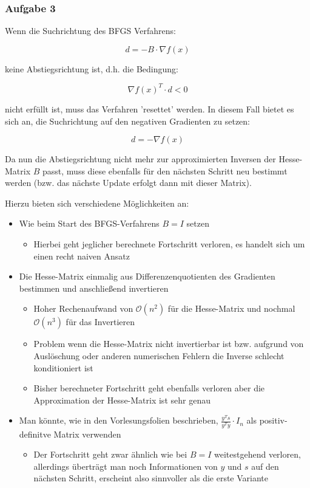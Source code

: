 \documentclass[a4paper, 12pt]{report}
\begin{document}
\subsubsection{Aufgabe 3}
Wenn die Suchrichtung des BFGS Verfahrens:

$$d = -B\cdot \nabla f(x) $$

keine Abstiegsrichtung ist, d.h. die Bedingung:

$$\nabla f(x)^T \cdot d < 0 $$

nicht erfüllt ist, muss das Verfahren 'resettet' werden. In diesem Fall bietet es sich an, die Suchrichtung auf den
negativen Gradienten zu setzen:

$$d = -\nabla f(x)$$

Da nun die Abstiegsrichtung nicht mehr zur approximierten Inversen der Hesse-Matrix $B$ passt, muss diese ebenfalls für
den nächsten Schritt neu bestimmt werden (bzw. das nächste Update erfolgt dann mit dieser Matrix).\par
Hierzu bieten sich verschiedene Möglichkeiten an:

\begin{itemize}
  \item Wie beim Start des BFGS-Verfahrens $B = I$ setzen
  \begin{itemize}
    \item Hierbei geht jeglicher berechnete Fortschritt verloren, es handelt sich um einen recht naiven Ansatz
  \end{itemize}
  \item Die Hesse-Matrix einmalig aus Differenzenquotienten des Gradienten bestimmen und anschließend invertieren
  \begin{itemize}
    \item Hoher Rechenaufwand von $\mathcal{O}(n^2)$ für die Hesse-Matrix und nochmal $\mathcal{O}(n^3)$ für das Invertieren
    \item Problem wenn die Hesse-Matrix nicht invertierbar ist bzw. aufgrund von Auslöschung oder anderen numerischen Fehlern
    die Inverse schlecht konditioniert ist
    \item Bisher berechneter Fortschritt geht ebenfalls verloren aber die Approximation der Hesse-Matrix ist sehr genau
  \end{itemize}
  \item Man könnte, wie in den Vorlesungsfolien beschrieben,  $\frac{y^Ts}{y^Ty}\cdot I_n$ als positiv-definitve Matrix verwenden
  \begin{itemize}
    \item Der Fortschritt geht zwar ähnlich wie bei $B = I$ weitestgehend verloren, allerdings überträgt man noch Informationen
    von $y$ und $s$ auf den nächsten Schritt, erscheint also sinnvoller als die erste Variante
  \end{itemize}
\end{itemize}
\end{document}
